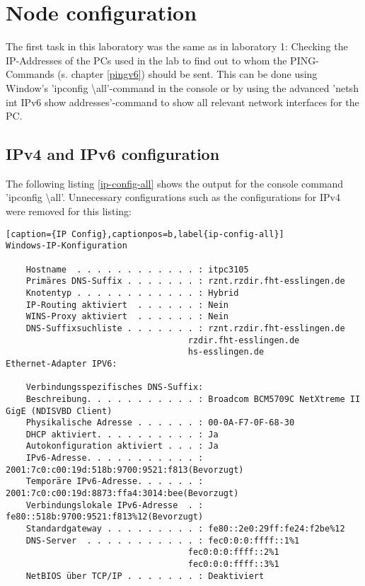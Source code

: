 \section{Node configuration}
The first task in this laboratory was the same as in laboratory 1: Checking the IP-Addresses of the PCs used in the lab to find out to whom the PING-Commands (s. chapter \ref{pingv6}) should be sent. This can be done using Window's 'ipconfig \textbackslash all'-command in the console or by using the advanced 'netsh int IPv6 show addresses'-command to show all relevant network interfaces for the PC.
\subsection{IPv4 and IPv6 configuration}
The following listing \ref{ip-config-all} shows the output for the console command 'ipconfig \textbackslash all'. Unnecessary configurations such as the configurations for IPv4 were removed for this listing:
\\ 
\begin{lstlisting}[caption={IP Config},captionpos=b,label{ip-config-all}]
Windows-IP-Konfiguration

	Hostname  . . . . . . . . . . . . : itpc3105
	Primäres DNS-Suffix . . . . . . . : rznt.rzdir.fht-esslingen.de
	Knotentyp . . . . . . . . . . . . : Hybrid
	IP-Routing aktiviert  . . . . . . : Nein
	WINS-Proxy aktiviert  . . . . . . : Nein
	DNS-Suffixsuchliste . . . . . . . : rznt.rzdir.fht-esslingen.de
									rzdir.fht-esslingen.de
									hs-esslingen.de
Ethernet-Adapter IPV6:

	Verbindungsspezifisches DNS-Suffix:
	Beschreibung. . . . . . . . . . . : Broadcom BCM5709C NetXtreme II GigE (NDISVBD Client)
	Physikalische Adresse . . . . . . : 00-0A-F7-0F-68-30
	DHCP aktiviert. . . . . . . . . . : Ja
	Autokonfiguration aktiviert . . . : Ja
	IPv6-Adresse. . . . . . . . . . . : 2001:7c0:c00:19d:518b:9700:9521:f813(Bevorzugt)
	Temporäre IPv6-Adresse. . . . . . : 2001:7c0:c00:19d:8873:ffa4:3014:bee(Bevorzugt)
	Verbindungslokale IPv6-Adresse  . : fe80::518b:9700:9521:f813%12(Bevorzugt)
	Standardgateway . . . . . . . . . : fe80::2e0:29ff:fe24:f2be%12
	DNS-Server  . . . . . . . . . . . : fec0:0:0:ffff::1%1
									fec0:0:0:ffff::2%1
									fec0:0:0:ffff::3%1
	NetBIOS über TCP/IP . . . . . . . : Deaktiviert
\end{lstlisting}
